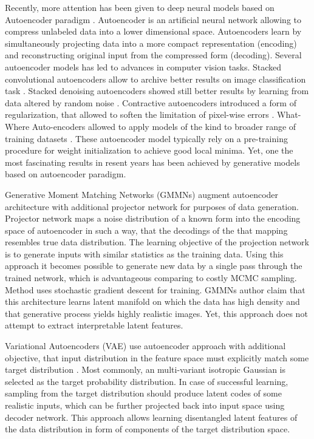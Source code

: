 Recently, more attention has been given to deep neural models based on Autoencoder paradigm \cite{Hinton2006}.
Autoencoder is an artificial neural network allowing to compress unlabeled data into a lower dimensional space.
Autoencoders learn by simultaneously projecting data into a more compact representation (encoding) and reconstructing original input from the compressed form (decoding).
Several autoencoder models has led to advances in computer vision tasks.
Stacked convolutional autoencoders allow to archive better results on image classification task \cite{Masci2011}.
Stacked denoising autoencoders showed still better results by learning from data altered by random noise  \cite{Vincent2010}.
Contractive autoencoders introduced a form of regularization, that allowed to soften the limitation of pixel-wise errors \cite{Rifai2011}.
What-Where Auto-encoders allowed to apply models of the kind to broader range of training datasets \cite{Zhao2015}.
These autoencoder model typically rely on a pre-training procedure for weight initialization to achieve good local minima.
Yet, one the most fascinating results in resent years has been achieved by generative models based on autoencoder paradigm.

Generative Moment Matching Networks (GMMNs) \cite{Li2015, Ren2016} augment autoencoder architecture with additional projector network for purposes of data generation.
Projector network maps a noise distribution of a known form into the encoding space of autoencoder in such a way, that the decodings of the that mapping resembles true data distribution.
The learning objective of the projection network is to generate inputs with similar statistics as the training data.
Using this approach it becomes possible to generate new data by a single pass through the trained network, which is advantageous comparing to costly MCMC sampling.
Method uses stochastic gradient descent for training.
GMMNs author claim that this architecture learns latent manifold on which the data has high density and that generative process yields highly realistic images.
Yet, this approach does not attempt to extract interpretable latent features.

Variational Autoencoders (VAE) use autoencoder approach with additional objective, that input distribution in the feature space must explicitly match some target distribution \cite{Kingma2013, Doersch2016}.
Most commonly, an multi-variant isotropic Gaussian is selected as the target probability distribution.
In case of successful learning, sampling from the target distribution should produce latent codes of some realistic inputs, which can be further projected back into input space using decoder network.
This approach allows learning disentangled latent features of the data distribution in form of components of the target distribution space.

